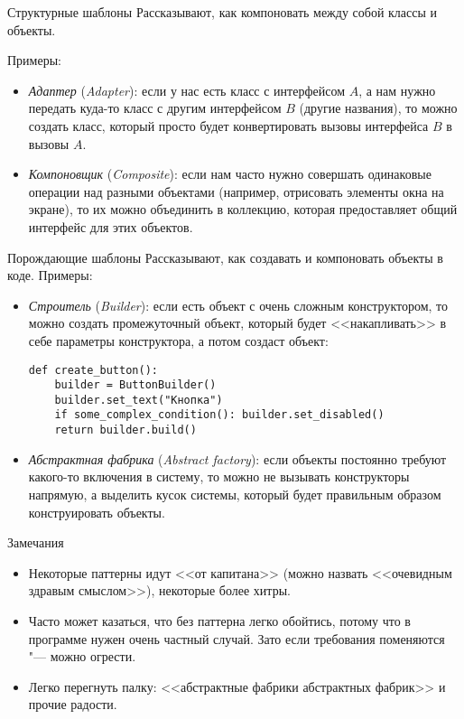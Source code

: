 \begin{frame}{Структурные шаблоны}
	Рассказывают, как компоновать между собой классы и объекты.

	Примеры:
	\begin{itemize}
		\item
			\textit{Адаптер} (\textit{Adapter}): если у нас есть класс с интерфейсом $A$, а нам нужно передать куда-то класс с другим интерфейсом $B$
			(другие названия), то можно создать класс, который просто будет конвертировать вызовы интерфейса $B$ в вызовы $A$.
		\item
			\textit{Компоновщик} (\textit{Composite}): если нам часто нужно совершать одинаковые операции над разными объектами (например, отрисовать элементы
			окна на экране), то их можно объединить в коллекцию, которая предоставляет общий интерфейс для этих объектов.
	\end{itemize}
\end{frame}

\begin{frame}[fragile]{Порождающие шаблоны}
	Рассказывают, как создавать и компоновать объекты в коде.
	Примеры:
	\begin{itemize}
		\item
			\textit{Строитель} (\textit{Builder}): если есть объект с очень сложным конструктором, то можно создать
			промежуточный объект, который будет <<накапливать>> в себе параметры конструктора, а потом создаст объект:
\begin{verbatim}
def create_button():
    builder = ButtonBuilder()
    builder.set_text("Кнопка")
    if some_complex_condition(): builder.set_disabled()
    return builder.build()
\end{verbatim}
		\item
			\textit{Абстрактная фабрика}  (\textit{Abstract factory}): если объекты постоянно требуют какого-то включения в систему, то можно
			не вызывать конструкторы напрямую, а выделить кусок системы, который будет
			правильным образом конструировать объекты.
	\end{itemize}
\end{frame}

\begin{frame}{Замечания}
	\begin{itemize}
		\item
			Некоторые паттерны идут <<от капитана>> (можно назвать <<очевидным здравым смыслом>>), некоторые более хитры.
		\item
			Часто может казаться, что без паттерна легко обойтись, потому что в программе нужен очень частный случай.
			Зато если требования поменяются "--- можно огрести.
		\item
			Легко перегнуть палку: <<абстрактные фабрики абстрактных фабрик>> и прочие радости.
	\end{itemize}
\end{frame}
